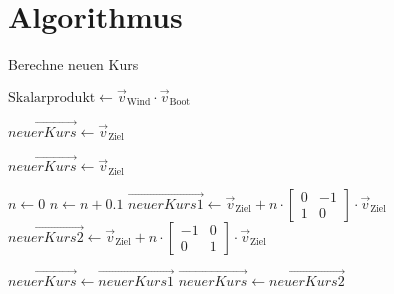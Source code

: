 \chapter{Algorithmus}
\label{appendix:algorythmus}







\begin{algorithm}
\caption{Berechne neuen Kurs}
\begin{algorithmic}[1]
    \State $\text{Skalarprodukt} \gets \vec{v}_{\text{Wind}} \cdot \vec{v}_{\text{Boot}}$
    
    \State $\vec{neuerKurs} \gets \vec{v}_{\text{Ziel}}$
    
            \State $\vec{neuerKurs} \gets \vec{v}_{\text{Ziel}}$
            \State \Return {}
        \EndIf
        
        \State $n \gets 0$
            \State $n \gets n + 0.1$
            \State $\vec{neuerKurs1} \gets \vec{v}_{\text{Ziel}} + n \cdot \begin{bmatrix}0 & -1 \\ 1 & 0\end{bmatrix} \cdot \vec{v}_{\text{Ziel}}$
            \State $\vec{neuerKurs2} \gets \vec{v}_{\text{Ziel}} + n \cdot \begin{bmatrix}-1 & 0 \\ 0 & 1\end{bmatrix} \cdot \vec{v}_{\text{Ziel}}$
            
                \State $\vec{neuerKurs} \gets \vec{neuerKurs1}$
            \Else
                \State $\vec{neuerKurs} \gets \vec{neuerKurs2}$
            \EndIf
        \EndWhile
        
        \State \Return {}
    \EndIf
\EndFunction
\end{algorithmic}
\end{algorithm}
